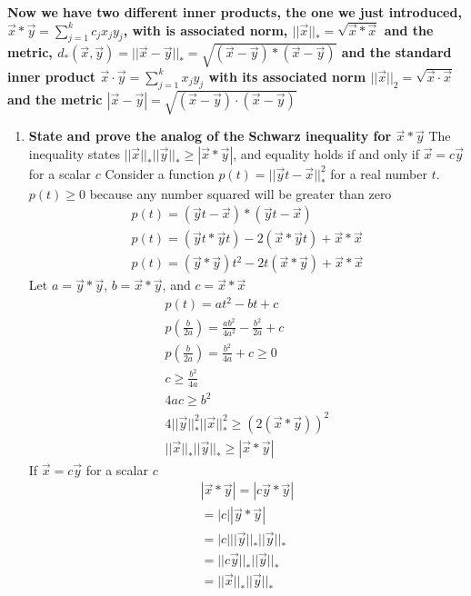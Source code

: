 \documentclass{article}
\begin{document}
\textbf{Now we have two different inner products, the one we just introduced, $\vec{x} * \vec{y} = \sum^k_{j=1}c_jx_jy_j$, with is associated norm, $||\vec{x}||_* = \sqrt{\vec{x}*\vec{x}}$ and the metric, $d_*(\vec{x},\vec{y}) = ||\vec{x} - \vec{y}||_* = \sqrt{(\vec{x} - \vec{y})*(\vec{x} - \vec{y})}$ and the standard inner product $\vec{x} \cdot \vec{y} = \sum^k_{j=1}x_jy_j$ with its associated norm $||\vec{x}||_2 = \sqrt{\vec{x} \cdot \vec{x}}$ and the metric $|\vec{x} - \vec{y}| = \sqrt{(\vec{x} - \vec{y}) \cdot (\vec{x} - \vec{y}) }$}
\begin{enumerate}[label = \textbf{\alph*)}]
    \item \textbf{State and prove the analog of the Schwarz inequality for $\vec{x} * \vec{y}$}
    The inequality states $||\vec{x}||_*||\vec{y}||_* \ge |\vec{x}*\vec{y}|$, and equality holds if and only if $\vec{x} = c\vec{y}$ for a scalar $c$
    Consider a function $p(t) = ||\vec{y}t-\vec{x}||_*^2$ for a real number $t$. $p(t) \ge 0$ because any number squared will be greater than zero
    \begin{align*}
        p(t) = (\vec{y}t-\vec{x})*(\vec{y}t-\vec{x})\\
        p(t) = (\vec{y}t * \vec{y}t) - 2(\vec{x} * \vec{y}t) + \vec{x} * \vec{x}\\
        p(t) = (\vec{y} * \vec{y})t^2 - 2t(\vec{x} * \vec{y}) + \vec{x} * \vec{x}
    \end{align*}
    Let $a = \vec{y} * \vec{y}$, $b = \vec{x} * \vec{y}$, and $c = \vec{x} * \vec{x}$
    \begin{align*}
        p(t) = at^2 - bt + c\\
        p(\frac{b}{2a}) = \frac{ab^2}{4a^2} - \frac{b^2}{2a} + c\\
        p(\frac{b}{2a}) = \frac{b^2}{4a} + c \ge 0\\
        c \ge \frac{b^2}{4a}\\
        4ac \ge b^2\\
        4||\vec{y}||_*^2||\vec{x}||_*^2 \ge (2(\vec{x} * \vec{y}))^2\\
        ||\vec{x}||_*||\vec{y}||_* \ge |\vec{x}*\vec{y}|
    \end{align*}
    If $\vec{x} = c\vec{y}$ for a scalar $c$
    \begin{align*}
        |\vec{x} * \vec{y}| = |c\vec{y} * \vec{y}|\\
        = |c||\vec{y} * \vec{y}|\\
        = |c|||\vec{y}||_*||\vec{y}||_*\\
        =||c\vec{y}||_*||\vec{y}||_*\\
        =||\vec{x}||_*||\vec{y}||_*\\
    \end{align*}


\end{enumerate}
\end{document}
